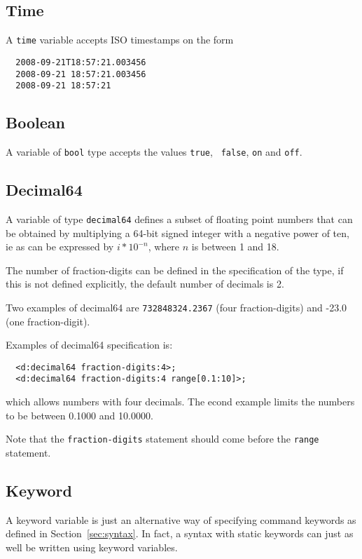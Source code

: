 \documentclass[a4paper, 10pt] {article}
\begin{document}
\subsection{Time}

A {\tt time} variable accepts ISO timestamps on the form

\begin{verbatim}
  2008-09-21T18:57:21.003456
  2008-09-21 18:57:21.003456
  2008-09-21 18:57:21
\end{verbatim}

\subsection{Boolean}

A variable of {\tt bool} type accepts the values {\tt true}, {\tt
  false}, {\tt on} and {\tt off}.

\subsection{Decimal64}

A variable of type {\tt decimal64} defines a subset of floating point
numbers that can be obtained by multiplying a 64-bit signed integer
with a negative power of ten, ie as can be expressed by $i * 10^{-n}$,
where $n$ is between 1 and 18.

The number of fraction-digits can be defined in the specification of
the type, if this is not defined explicitly, the default number of decimals is 2.

Two examples of decimal64 are {\tt 732848324.2367} (four
fraction-digits) and -23.0 (one fraction-digit).

Examples of decimal64 specification is:
\begin{verbatim}
  <d:decimal64 fraction-digits:4>;
  <d:decimal64 fraction-digits:4 range[0.1:10]>;
\end{verbatim}
which allows numbers with four decimals. The econd example limits the numbers to be between 0.1000 and 10.0000.

Note that the {\tt fraction-digits} statement should come before the {\tt range} statement.

\subsection{Keyword}
\label{sec:keyword}

A keyword variable is just an alternative way of specifying command
keywords as defined in Section~\ref{sec:syntax}. In fact, a syntax
with static keywords can just as well be written using keyword
variables. 
\end{document}
